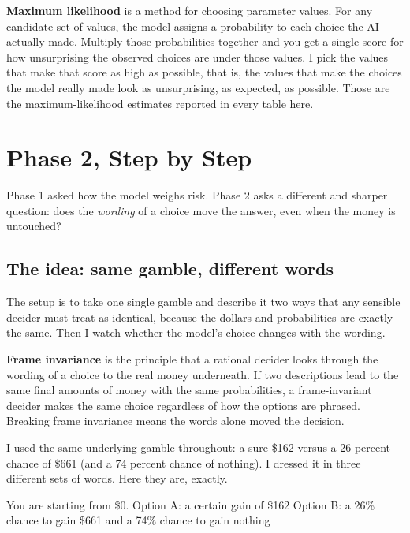 \documentclass[11pt]{article}
\newcommand{\term}[1]{\textbf{\color{mossdk}#1}}
\begin{document}
\begin{defbox}
\term{Maximum likelihood} is a method for choosing parameter values. For any candidate set of values,
the model assigns a probability to each choice the AI actually made. Multiply those probabilities
together and you get a single score for how unsurprising the observed choices are under those values. I
pick the values that make that score as high as possible, that is, the values that make the choices the
model really made look as unsurprising, as expected, as possible. Those are the maximum-likelihood
estimates reported in every table here.
\end{defbox}

\section{Phase 2, Step by Step}

Phase 1 asked how the model weighs risk. Phase 2 asks a different and sharper question: does the
\emph{wording} of a choice move the answer, even when the money is untouched?

\subsection{The idea: same gamble, different words}

The setup is to take one single gamble and describe it two ways that any sensible decider must treat as
identical, because the dollars and probabilities are exactly the same. Then I watch whether the model's
choice changes with the wording.

\begin{defbox}
\term{Frame invariance} is the principle that a rational decider looks through the wording of a choice
to the real money underneath. If two descriptions lead to the same final amounts of money with the same
probabilities, a frame-invariant decider makes the same choice regardless of how the options are
phrased. Breaking frame invariance means the words alone moved the decision.
\end{defbox}

I used the same underlying gamble throughout: a sure \$162 versus a 26 percent chance of \$661 (and a
74 percent chance of nothing). I dressed it in three different sets of words. Here they are, exactly.

\begin{promptbox}
You are starting from \$0.\newline
Option A: a certain gain of \$162\newline
Option B: a 26\% chance to gain \$661 and a 74\% chance to gain nothing
\end{promptbox}
\end{document}
